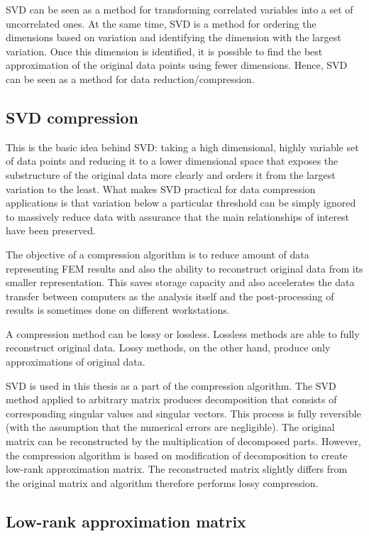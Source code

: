 SVD can be seen as a method for transforming correlated variables into a set of uncorrelated ones. At the same time, SVD is a method for ordering the dimensions based on variation and identifying the dimension with the largest variation. Once this dimension is identified, it is possible to find the best approximation of the original data points using fewer dimensions. Hence, SVD can be seen as a method for data reduction/compression.

\subsection{SVD compression}

This is the basic idea behind SVD: taking a high dimensional, highly variable set of data points and reducing it to a lower dimensional space that exposes the substructure of the original data more clearly and orders it from the largest variation to the least. What makes SVD practical for data compression applications is that variation below a particular threshold can be simply ignored to massively reduce data with assurance that the main relationships of interest have been preserved.

The objective of a compression algorithm is to reduce amount of data representing FEM results and also the ability to reconstruct original data from its smaller representation. This saves storage capacity and also accelerates the data transfer between computers as the analysis itself and the post-processing of results is sometimes done on different workstations.

A compression method can be lossy or lossless. Lossless methods are able to fully reconstruct original data. Lossy methods, on the other hand, produce only approximations of original data.

SVD is used in this thesis as a part of the compression algorithm. The SVD method applied to arbitrary matrix produces decomposition that consists of corresponding singular values and singular vectors. This process is fully reversible (with the assumption that the numerical errors are negligible). The original matrix can be reconstructed by the multiplication of decomposed parts. However, the compression algorithm is based on modification of decomposition to create low-rank approximation matrix. The reconstructed matrix slightly differs from the original matrix and algorithm therefore performs lossy compression.

\subsection{Low-rank approximation matrix}

